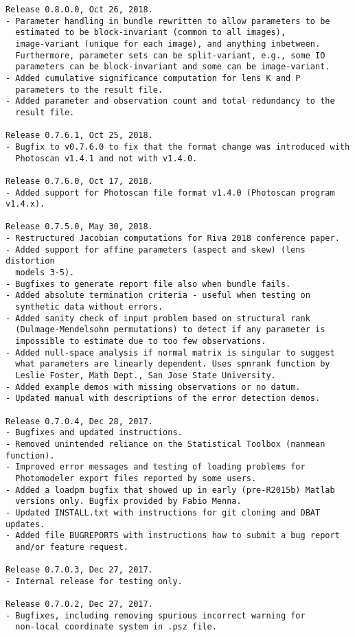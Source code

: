 \documentclass{article}
\begin{document}
\begin{verbatim}
Release 0.8.0.0, Oct 26, 2018.
- Parameter handling in bundle rewritten to allow parameters to be
  estimated to be block-invariant (common to all images),
  image-variant (unique for each image), and anything inbetween.
  Furthermore, parameter sets can be split-variant, e.g., some IO
  parameters can be block-invariant and some can be image-variant.
- Added cumulative significance computation for lens K and P
  parameters to the result file.
- Added parameter and observation count and total redundancy to the
  result file.

Release 0.7.6.1, Oct 25, 2018.
- Bugfix to v0.7.6.0 to fix that the format change was introduced with
  Photoscan v1.4.1 and not with v1.4.0.

Release 0.7.6.0, Oct 17, 2018.
- Added support for Photoscan file format v1.4.0 (Photoscan program v1.4.x).

Release 0.7.5.0, May 30, 2018.
- Restructured Jacobian computations for Riva 2018 conference paper.
- Added support for affine parameters (aspect and skew) (lens distortion
  models 3-5).
- Bugfixes to generate report file also when bundle fails.
- Added absolute termination criteria - useful when testing on
  synthetic data without errors.
- Added sanity check of input problem based on structural rank
  (Dulmage-Mendelsohn permutations) to detect if any parameter is
  impossible to estimate due to too few observations.
- Added null-space analysis if normal matrix is singular to suggest
  what parameters are linearly dependent. Uses spnrank function by
  Leslie Foster, Math Dept., San Jose State University.
- Added example demos with missing observations or no datum.
- Updated manual with descriptions of the error detection demos.

Release 0.7.0.4, Dec 28, 2017.
- Bugfixes and updated instructions.
- Removed unintended reliance on the Statistical Toolbox (nanmean function).
- Improved error messages and testing of loading problems for
  Photomodeler export files reported by some users.
- Added a loadpm bugfix that showed up in early (pre-R2015b) Matlab
  versions only. Bugfix provided by Fabio Menna.
- Updated INSTALL.txt with instructions for git cloning and DBAT updates.
- Added file BUGREPORTS with instructions how to submit a bug report
  and/or feature request.

Release 0.7.0.3, Dec 27, 2017.
- Internal release for testing only.

Release 0.7.0.2, Dec 27, 2017.
- Bugfixes, including removing spurious incorrect warning for
  non-local coordinate system in .psz file.


\end{verbatim}
\end{document}
